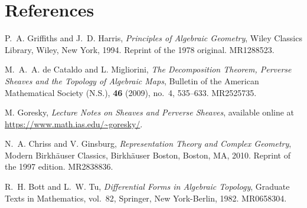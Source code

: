 \documentclass[12pt]{article}
\begin{document}
\section{References}
\begin{enumerate}
     P.~A. Griffiths and J.~D. Harris, \emph{Principles of Algebraic Geometry}, Wiley Classics Library, Wiley, New York, 1994. Reprint of the 1978 original. MR1288523.

     M.~A.~A. de Cataldo and L. Migliorini, \emph{The Decomposition Theorem, Perverse Sheaves and the Topology of Algebraic Maps}, Bulletin of the American Mathematical Society (N.S.), \textbf{46} (2009), no.~4, 535--633. MR2525735.

     M. Goresky, \emph{Lecture Notes on Sheaves and Perverse Sheaves}, available online at \url{https://www.math.ias.edu/~goresky/}.

     N.~A. Chriss and V. Ginsburg, \emph{Representation Theory and Complex Geometry}, Modern Birkhäuser Classics, Birkhäuser Boston, Boston, MA, 2010. Reprint of the 1997 edition. MR2838836.

     R.~H. Bott and L.~W. Tu, \emph{Differential Forms in Algebraic Topology}, Graduate Texts in Mathematics, vol.~82, Springer, New York-Berlin, 1982. MR0658304.

\end{enumerate}
\end{document}
